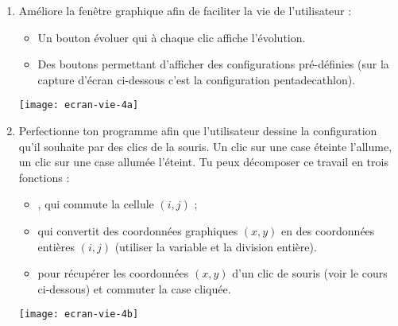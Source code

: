 \documentclass[11pt,class=report,crop=false]{standalone}
\begin{document}
 


\begin{activite}[Itérations]


\begin{enumerate}
  \item  Améliore la fenêtre graphique afin de faciliter la vie de l'utilisateur :
  \begin{itemize}
    \item Un bouton \og{}évoluer\fg{} qui à chaque clic affiche l'évolution.
    \item Des boutons permettant d'afficher des configurations pré-définies (sur la capture d'écran ci-dessous c'est la configuration \og{}pentadecathlon\fg{}).
  \end{itemize}
  
\begin{center}
\texttt{[image: ecran-vie-4a]}
\end{center}  
  
  \item Perfectionne ton programme afin que l'utilisateur dessine la configuration qu'il souhaite par des clics de la souris. Un clic sur une case éteinte l'allume, un clic sur une case allumée l'éteint. 
  Tu peux décomposer ce travail en trois fonctions :
  \begin{itemize}
    \item {}, qui commute la cellule $(i,j)$ ;
    \item {} qui convertit des coordonnées graphiques $(x,y)$ en des coordonnées entières $(i,j)$ (utiliser la variable  et la division entière).
    \item {} pour récupérer les coordonnées $(x,y)$ d'un clic de souris (voir le cours ci-dessous) et commuter la case cliquée.
  \end{itemize}   
    
\begin{center}
\texttt{[image: ecran-vie-4b]}
\end{center}

    
\end{enumerate}
\end{activite} 
\end{document}
